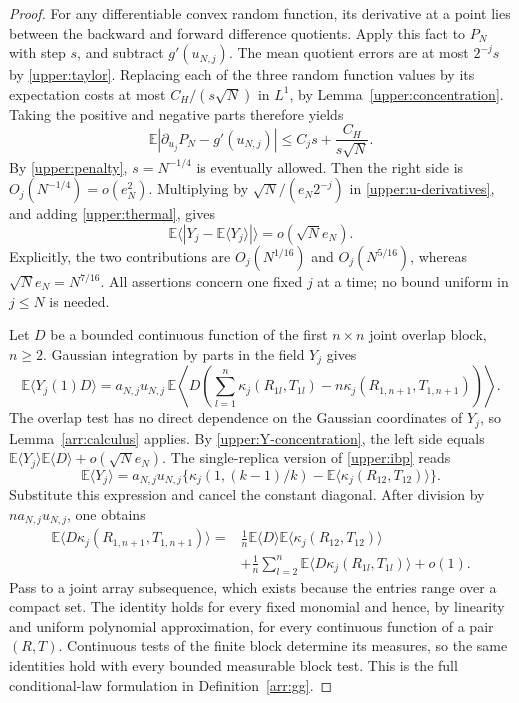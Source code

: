 \begin{proof}
For any differentiable convex random function, its derivative
at a point lies between the backward and forward difference
quotients. Apply this fact to $P_N$ with step $s$, and subtract
$g'(u_{N,j})$. The mean quotient errors are at most $2^{-j}s$
by \eqref{upper:taylor}. Replacing each of the three random
function values by its expectation costs at most
$C_H/(s\sqrt N)$ in $L^1$, by
Lemma~\ref{upper:concentration}. Taking the positive and
negative parts therefore yields
\begin{equation}
\label{upper:derivative-fluctuation}
 \mathbb E|\partial_{u_j}P_N-g'(u_{N,j})|
 \le C_js+\frac{C_H}{s\sqrt N}.
\end{equation}
By \eqref{upper:penalty}, $s=N^{-1/4}$ is eventually allowed.
Then the right side is $O_j(N^{-1/4})=o(e_N^2)$.
Multiplying by $\sqrt N/(e_N2^{-j})$ in
\eqref{upper:u-derivatives}, and adding
\eqref{upper:thermal}, gives
\begin{equation}
\label{upper:Y-concentration}
 \mathbb E\langle|Y_j-\mathbb E\langle Y_j\rangle|\rangle
 =o(\sqrt N e_N).
\end{equation}
Explicitly, the two contributions are
$O_j(N^{1/16})$ and $O_j(N^{5/16})$, whereas
$\sqrt N e_N=N^{7/16}$. All assertions concern one fixed
$j$ at a time; no bound uniform in $j\le N$ is needed.

Let $D$ be a bounded continuous function of the first
$n\times n$ joint overlap block, $n\ge2$. Gaussian
integration by parts in the field $Y_j$ gives
\begin{equation}
\label{upper:ibp}
 \mathbb E\langle Y_j(1)D\rangle
 =a_{N,j}u_{N,j}\,
 \mathbb E\left\langle D\left(
    \sum_{l=1}^n\kappa_j(R_{1l},T_{1l})
       -n\kappa_j(R_{1,n+1},T_{1,n+1})\right)\right\rangle.
\end{equation}
The overlap test has no direct dependence on the Gaussian
coordinates of $Y_j$, so Lemma~\ref{arr:calculus} applies.
By \eqref{upper:Y-concentration}, the left side equals
$\mathbb E\langle Y_j\rangle\mathbb E\langle D\rangle
+o(\sqrt N e_N)$. The single-replica version of
\eqref{upper:ibp} reads
\[
 \mathbb E\langle Y_j\rangle
 =a_{N,j}u_{N,j}
   \{\kappa_j(1,(k-1)/k)
          -\mathbb E\langle\kappa_j(R_{12},T_{12})\rangle\}.
\]
Substitute this expression and cancel the constant diagonal.
After division by $n a_{N,j}u_{N,j}$, one obtains
\begin{align*}
 \mathbb E\langle D\kappa_j(R_{1,n+1},T_{1,n+1})\rangle
 ={}&\frac1n\mathbb E\langle D\rangle
             \mathbb E\langle\kappa_j(R_{12},T_{12})\rangle\\
 &+\frac1n\sum_{l=2}^n
       \mathbb E\langle D\kappa_j(R_{1l},T_{1l})\rangle+o(1).
\end{align*}
Pass to a joint array subsequence, which exists because the
entries range over a compact set. The identity holds for every
fixed monomial and hence, by linearity and uniform polynomial
approximation, for every continuous function of a pair $(R,T)$.
Continuous tests of the finite block determine its measures,
so the same identities hold with every bounded measurable
block test. This is the full conditional-law formulation in
Definition~\ref{arr:gg}.
\end{proof}

